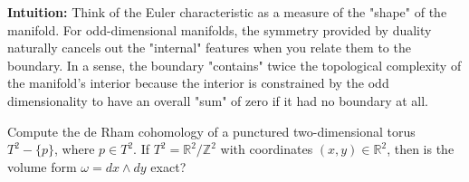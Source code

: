 \begin{solution}
\textbf{Intuition:}
Think of the Euler characteristic as a measure of the "shape" of the manifold. For odd-dimensional manifolds, the symmetry provided by duality naturally cancels out the "internal" features when you relate them to the boundary. In a sense, the boundary "contains" twice the topological complexity of the manifold's interior because the interior is constrained by the odd dimensionality to have an overall "sum" of zero if it had no boundary at all.
\end{solution}

\begin{exercise}
\label{geometry:2016:2}
Compute the de Rham cohomology of a punctured two-dimensional torus $T^{2} - \{p\}$, where $p \in T^{2}$. If $T^{2} = \mathbb{R}^{2} / \mathbb{Z}^{2}$ with coordinates $(x, y) \in \mathbb{R}^{2}$, then is the volume form $\omega = dx \wedge dy$ exact?
\end{exercise}

